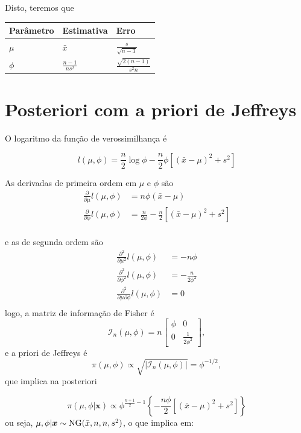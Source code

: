 \documentclass[
  letterpaper,
  DIV=11,
  numbers=noendperiod]{scrreprt}
\theoremstyle{definition}
\theoremstyle{definition}
\theoremstyle{remark}
\begin{document}
Disto, teremos que

\begin{longtable}[]{@{}lll@{}}
\toprule\noalign{}
Parâmetro & Estimativa & Erro \\
\midrule\noalign{}
\endhead
\bottomrule\noalign{}
\endlastfoot
\(\mu\) & \(\bar{x}\) & \(\frac{s}{\sqrt{n-3}}\) \\
\(\phi\) & \(\frac{n-1}{ns^2}\) & \(\frac{\sqrt{2(n-1)}}{s^2n}\) \\
\end{longtable}

\hypertarget{posteriori-com-a-priori-de-jeffreys}{%
\section{Posteriori com a priori de
Jeffreys}\label{posteriori-com-a-priori-de-jeffreys}}

O logaritmo da função de verossimilhança é

\[l(\mu,\phi)=\frac{n}{2}\log\phi -\frac{n}{2}\phi\left[(\bar{x}-\mu)^2 + s^2\right]\]

As derivadas de primeira ordem em \(\mu\) e \(\phi\) são \[\begin{align}
\frac{\partial}{\partial \mu}l(\mu,\phi)&=n\phi(\bar{x}-\mu)\\
\frac{\partial}{\partial \phi}l(\mu,\phi)&=\frac{n}{2\phi}-\frac{n}{2}\left[(\bar{x}-\mu)^2 + s^2\right]\\
\end{align}\]

e as de segunda ordem são \[\begin{align}
\frac{\partial^2}{\partial \mu^2}l(\mu,\phi)&=-n\phi\\
\frac{\partial^2}{\partial \phi^2}l(\mu,\phi)&=-\frac{n}{2\phi^2}\\
\frac{\partial^2}{\partial \mu\partial \phi}l(\mu,\phi)&=0\\
\end{align}
\] logo, a matriz de informação de Fisher é
\[\mathcal{I}_n(\mu,\phi)=n\left[\begin{array}{cc}\phi & 0 \\0 & \frac{1}{2\phi^2}\end{array}\right],\]
e a priori de Jeffreys é
\[\pi(\mu,\phi)\propto \sqrt{|\mathcal{I}_n(\mu,\phi)|}=\phi^{-1/2},\]
que implica na posteriori

\[\pi(\mu,\phi|\boldsymbol{x})\propto \phi^{\frac{n+1}{2}-1}\left\{-\frac{n\phi}{2}\left[(\bar{x}-\mu)^2 +s^2 \right]\right\}\]
ou seja, \(\mu,\phi|\boldsymbol{x}\sim\hbox{NG}(\bar{x},n,n,s^2)\), o
que implica em:
\end{document}
